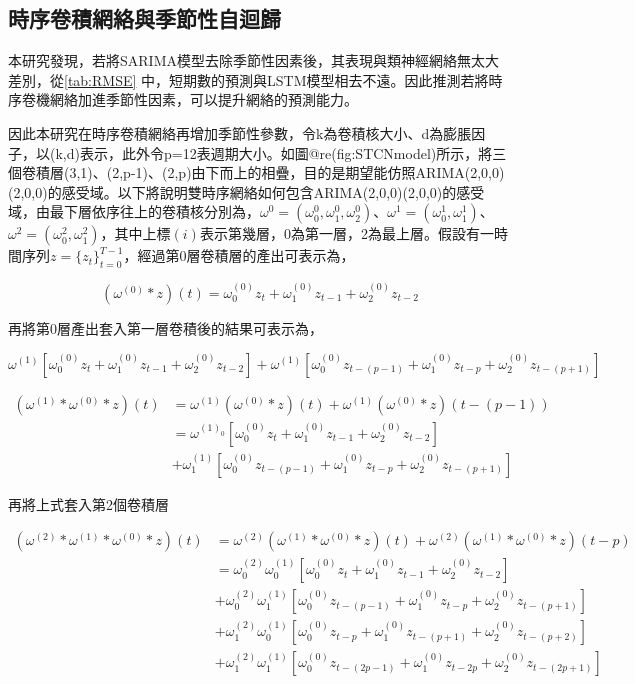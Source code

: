 \documentclass[oneside]{book}
\begin{document}
\hypertarget{ux6642ux5e8fux5377ux7a4dux7db2ux7d61ux8207ux5b63ux7bc0ux6027ux81eaux8ff4ux6b78}{%
\subsection{時序卷積網絡與季節性自迴歸}\label{ux6642ux5e8fux5377ux7a4dux7db2ux7d61ux8207ux5b63ux7bc0ux6027ux81eaux8ff4ux6b78}}

本研究發現，若將SARIMA模型去除季節性因素後，其表現與類神經網絡無太大差別，從\ref{tab:RMSE} 中，短期數的預測與LSTM模型相去不遠。因此推測若將時序卷機網絡加進季節性因素，可以提升網絡的預測能力。

因此本研究在時序卷積網絡再增加季節性參數，令k為卷積核大小、d為膨脹因子，以(k,d)表示，此外令p=12表週期大小。如圖@re(fig:STCNmodel)所示，將三個卷積層(3,1)、(2,p-1)、(2,p)由下而上的相疊，目的是期望能仿照ARIMA(2,0,0)(2,0,0)的感受域。以下將說明雙時序網絡如何包含ARIMA(2,0,0)(2,0,0)的感受域，由最下層依序往上的卷積核分別為，\(\omega^{0}=(\omega^{0}_0,\omega^{0}_1,\omega^{0}_2)\)、\(\omega^{1}=(\omega^{1}_0,\omega^{1}_1)\)、\(\omega^{2}=(\omega^{2}_0,\omega^{2}_1)\)，其中上標\((i)\)表示第幾層，0為第一層，2為最上層。假設有一時間序列\(z=\{z_t\}^{T-1}_{t=0}\)，經過第0層卷積層的產出可表示為，

\[(\omega^{(0)}*z)(t)=\omega^{(0)}_0z_t+\omega^{(0)}_1z_{t-1}+\omega^{(0)}_2z_{t-2}\]

再將第0層產出套入第一層卷積後的結果可表示為，

\[\omega^{(1)}[\omega^{(0)}_0z_t+\omega^{(0)}_1z_{t-1}+\omega^{(0)}_2z_{t-2}]+\omega^{(1)}[\omega^{(0)}_0z_{t-(p-1)}+\omega^{(0)}_1z_{t-p}+\omega^{(0)}_2z_{t-(p+1)}]\]

\begin{align*}
(\omega^{(1)}*\omega^{(0)}*z)(t)&=\omega^{(1)}(\omega^{(0)}*z)(t)+\omega^{(1)}(\omega^{(0)}*z)(t-(p-1)) \\
      &= \omega^{(1)_0}[\omega^{(0)}_0z_t+\omega^{(0)}_1z_{t-1}+\omega^{(0)}_2z_{t-2}] \\
      &+\omega^{(1)}_1[\omega^{(0)}_0z_{t-(p-1)}+\omega^{(0)}_1z_{t-p}+\omega^{(0)}_2z_{t-(p+1)}]
\end{align*}

再將上式套入第2個卷積層

\begin{align*}
(\omega^{(2)}*\omega^{(1)}*\omega^{(0)}*z)(t) &=\omega^{(2)}(\omega^{(1)}*\omega^{(0)}*z)(t)+\omega^{(2)}(\omega^{(1)}*\omega^{(0)}*z)(t-p)\\
&= \omega^{(2)}_0\omega^{(1)}_0[\omega^{(0)}_0z_t+\omega^{(0)}_1z_{t-1}+\omega^{(0)}_2z_{t-2}]\\
      &+\omega^{(2)}_0\omega^{(1)}_1[\omega^{(0)}_0z_{t-(p-1)}+\omega^{(0)}_1z_{t-p}+\omega^{(0)}_2z_{t-(p+1)}]\\
      &+\omega^{(2)}_1\omega^{(1)}_0[\omega^{(0)}_0z_{t-p}+\omega^{(0)}_1z_{t-(p+1)}+\omega^{(0)}_2z_{t-(p+2)}]\\
      &+\omega^{(2)}_1\omega^{(1)}_1[\omega^{(0)}_0z_{t-(2p-1)}+\omega^{(0)}_1z_{t-2p}+\omega^{(0)}_2z_{t-(2p+1)}]
\end{align*}
\end{document}
